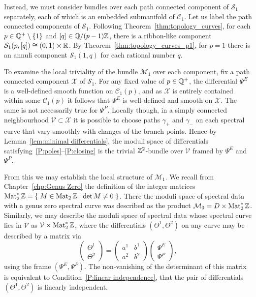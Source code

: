 Instead, we must consider bundles over each path connected component of $\mathcal{S}_1$ separately, each of which is an embedded submanifold of $\mathcal{C}_1$.
Let us label the path connected components of $\mathcal{S}_1$. Following Theorem~\ref{thm:topology_curves}, for each $p\in \Q^+\setminus\{1\}$ and $[q] \in \Q / (p-1) \Z$, there is a ribbon-like component $\mathcal{S}_1(p,[q]) \diffeo (0,1)\times\R$. By Theorem~\ref{thm:topology_curves_p1}, for $p=1$ there is an annuli component $\mathcal{S}_1(1,q)$ for each rational number $q$.

To examine the local triviality of the bundle $\mathcal{M}_1$ over each component, fix a path connected component $\mathcal{X}$ of $\mathcal{S}_1$. For any fixed value of $p \in \Q^+$, the differential $Ψ^E$ is a well-defined smooth function on $\mathcal{C}_1(p)$, and as $\mathcal{X}$ is entirely contained within some $\mathcal{C}_1(p)$ it follows that $Ψ^E$ is well-defined and smooth on $\mathcal{X}$. The same is not necessarily true for $Ψ^P$.
Locally though, in a simply connected neighbourhood $\mathcal{V} \subset \mathcal{X}$ it is possible to choose paths $γ_+$ and $γ_-$ on each spectral curve that vary smoothly with changes of the branch points. Hence by Lemma~\ref{lem:minimal differentials}, the moduli space of differentials satisfying~\ref{P:poles}--\ref{P:closing} is the trivial $\Z^2$-bundle over $\mathcal{V}$ framed by $Ψ^E$ and $Ψ^P$.

From this we may establish the local structure of $\mathcal{M}_1$.
We recall from Chapter~\ref{chp:Genus Zero} the definition of the integer matrices $\Mat_2^*\Z = \Set{ M \in \Mat_2\Z }{\det M \neq 0}$. There the moduli space of spectral data with a genus zero spectral curve was described as the product $\mathcal{M}_0 = D \times \Mat_2^*\Z$. Similarly, we may describe the moduli space of spectral data whose spectral curve lies in $\mathcal{V}$ as $\mathcal{V} \times \Mat_2^*\Z$, where the differentials $(Θ^1,Θ^2)$ on any curve may be described by a matrix via
\[
\begin{pmatrix}
Θ^1 \\ Θ^2
\end{pmatrix}
=
\begin{pmatrix}
a^1 & b^1 \\
a^2 & b^2
\end{pmatrix}
\begin{pmatrix}
Ψ^E \\ Ψ^P
\end{pmatrix},
\]
using the frame $(Ψ^E,Ψ^P)$. The non-vanishing of the determinant of this matrix is equivalent to Condition~\ref{P:linear independence}, that the pair of differentials $(Θ^1,Θ^2)$ is linearly independent.

